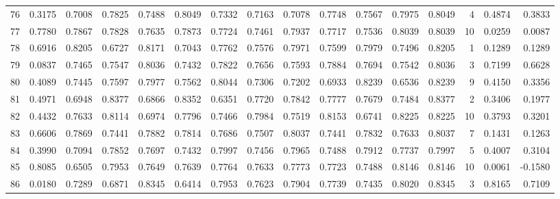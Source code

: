 \begin{tabular}{lrrrrrrrrrrrrrrr}
76  &      0.3175 &  0.7008 &  0.7825 &  0.7488 &  0.8049 &  0.7332 &  0.7163 &  0.7078 &  0.7748 &  0.7567 &   0.7975 &     0.8049 &      4 &                    0.4874 &                     0.3833 \\
77  &      0.7780 &  0.7867 &  0.7828 &  0.7635 &  0.7873 &  0.7724 &  0.7461 &  0.7937 &  0.7717 &  0.7536 &   0.8039 &     0.8039 &     10 &                    0.0259 &                     0.0087 \\
78  &      0.6916 &  0.8205 &  0.6727 &  0.8171 &  0.7043 &  0.7762 &  0.7576 &  0.7971 &  0.7599 &  0.7979 &   0.7496 &     0.8205 &      1 &                    0.1289 &                     0.1289 \\
79  &      0.0837 &  0.7465 &  0.7547 &  0.8036 &  0.7432 &  0.7822 &  0.7656 &  0.7593 &  0.7884 &  0.7694 &   0.7542 &     0.8036 &      3 &                    0.7199 &                     0.6628 \\
80  &      0.4089 &  0.7445 &  0.7597 &  0.7977 &  0.7562 &  0.8044 &  0.7306 &  0.7202 &  0.6933 &  0.8239 &   0.6536 &     0.8239 &      9 &                    0.4150 &                     0.3356 \\
81  &      0.4971 &  0.6948 &  0.8377 &  0.6866 &  0.8352 &  0.6351 &  0.7720 &  0.7842 &  0.7777 &  0.7679 &   0.7484 &     0.8377 &      2 &                    0.3406 &                     0.1977 \\
82  &      0.4432 &  0.7633 &  0.8114 &  0.6974 &  0.7796 &  0.7466 &  0.7984 &  0.7519 &  0.8153 &  0.6741 &   0.8225 &     0.8225 &     10 &                    0.3793 &                     0.3201 \\
83  &      0.6606 &  0.7869 &  0.7441 &  0.7882 &  0.7814 &  0.7686 &  0.7507 &  0.8037 &  0.7441 &  0.7832 &   0.7633 &     0.8037 &      7 &                    0.1431 &                     0.1263 \\
84  &      0.3990 &  0.7094 &  0.7852 &  0.7697 &  0.7432 &  0.7997 &  0.7456 &  0.7965 &  0.7488 &  0.7912 &   0.7737 &     0.7997 &      5 &                    0.4007 &                     0.3104 \\
85  &      0.8085 &  0.6505 &  0.7953 &  0.7649 &  0.7639 &  0.7764 &  0.7633 &  0.7773 &  0.7723 &  0.7488 &   0.8146 &     0.8146 &     10 &                    0.0061 &                    -0.1580 \\
86  &      0.0180 &  0.7289 &  0.6871 &  0.8345 &  0.6414 &  0.7953 &  0.7623 &  0.7904 &  0.7739 &  0.7435 &   0.8020 &     0.8345 &      3 &                    0.8165 &                     0.7109 \\

\end{tabular}
